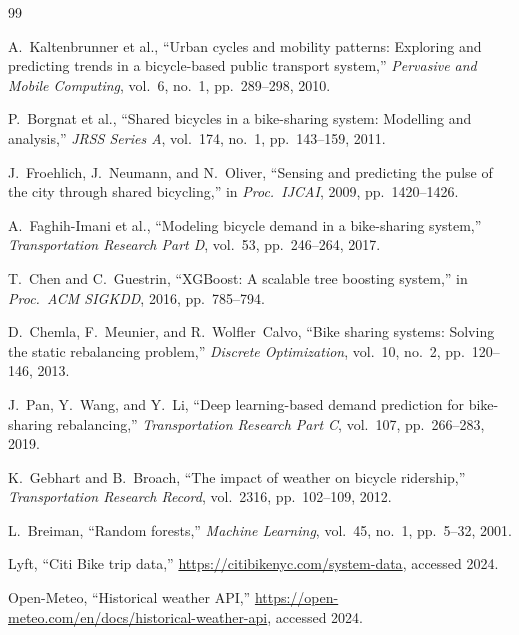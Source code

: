\documentclass[12pt,a4paper]{report}
\begin{document}
\begin{thebibliography}{99}

A.~Kaltenbrunner et al., ``Urban cycles and mobility patterns:
Exploring and predicting trends in a bicycle-based public transport
system,'' \emph{Pervasive and Mobile Computing}, vol.~6, no.~1,
pp.~289--298, 2010.

P.~Borgnat et al., ``Shared bicycles in a bike-sharing system:
Modelling and analysis,'' \emph{JRSS Series A}, vol.~174, no.~1,
pp.~143--159, 2011.

J.~Froehlich, J.~Neumann, and N.~Oliver, ``Sensing and predicting the
pulse of the city through shared bicycling,'' in \emph{Proc.\
IJCAI}, 2009, pp.~1420--1426.

A.~Faghih-Imani et al., ``Modeling bicycle demand in a
bike-sharing system,'' \emph{Transportation Research Part D},
vol.~53, pp.~246--264, 2017.

T.~Chen and C.~Guestrin, ``XGBoost: A scalable tree boosting
system,'' in \emph{Proc.\ ACM SIGKDD}, 2016, pp.~785--794.

D.~Chemla, F.~Meunier, and R.~Wolfler~Calvo, ``Bike sharing systems:
Solving the static rebalancing problem,'' \emph{Discrete
Optimization}, vol.~10, no.~2, pp.~120--146, 2013.

J.~Pan, Y.~Wang, and Y.~Li, ``Deep learning-based demand prediction
for bike-sharing rebalancing,'' \emph{Transportation Research Part
C}, vol.~107, pp.~266--283, 2019.

K.~Gebhart and B.~Broach, ``The impact of weather on bicycle
ridership,'' \emph{Transportation Research Record}, vol.~2316,
pp.~102--109, 2012.

L.~Breiman, ``Random forests,'' \emph{Machine Learning}, vol.~45,
no.~1, pp.~5--32, 2001.

Lyft, ``Citi Bike trip data,''
\url{https://citibikenyc.com/system-data}, accessed 2024.

Open-Meteo, ``Historical weather API,''
\url{https://open-meteo.com/en/docs/historical-weather-api},
accessed 2024.

\end{thebibliography}

\appendix
\end{document}
